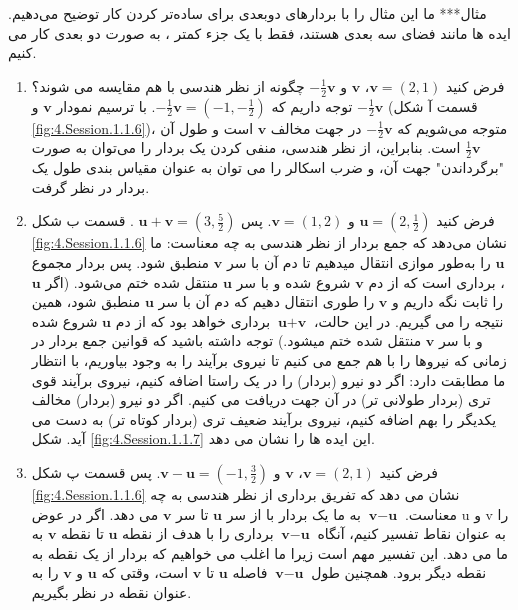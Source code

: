 {\begin{spacing}{1.5}
        مثال***
        ما این مثال را با بردارهای دوبعدی برای ساده‌تر کردن کار توضیح می‌دهیم. ایده ها مانند فضای سه بعدی هستند، فقط با یک جزء کمتر ، به صورت دو بعدی کار می کنیم.

        \begin{enumerate}
            \item {فرض کنید $\textbf{v}=(2,1)$، $\textbf{v}$ و $-\frac{1}{2}\textbf{v}$ چگونه از نظر هندسی با هم مقایسه می شوند؟
            توجه داریم که $-\frac{1}{2}\textbf{v}=(-1,-\frac{1}{2})$.
            با ترسیم نمودار $\textbf{v}$ و $-\frac{1}{2}\textbf{v}$ (قسمت آ شکل \ref{fig:4.Session.1.1.6})،
            متوجه می‌شویم که $-\frac{1}{2}\textbf{v}$ در جهت مخالف $\textbf{v}$ است و طول آن $\frac{1}{2}\textbf{v}$ است.
            بنابراین، از نظر هندسی، منفی کردن یک بردار را می‌توان به صورت "برگرداندن" جهت آن،
            و ضرب اسکالر را می توان به عنوان مقیاس بندی طول یک بردار در نظر گرفت.}

            \item {فرض کنید $\textbf{u}=(2,\frac{1}{2})$ و $\textbf{v}=(1,2)$. پس $\textbf{u}+\textbf{v}=(3,\frac{5}{2})$ .
            قسمت ب شکل \ref{fig:4.Session.1.1.6} نشان می‌دهد که جمع بردار از نظر هندسی به چه معناست:
            ما $\textbf{u}$ را به‌طور موازی انتقال میدهیم تا دم آن با سر $\textbf{v}$ منطبق شود.
            پس بردار مجموع ، برداری است که از دم $\textbf{v}$ شروع شده و با سر $\textbf{u}$ منتقل شده ختم می‌شود.
                (اگر $\textbf{u}$ را ثابت نگه داریم و $\textbf{v}$ را طوری انتقال دهیم که دم آن با سر $\textbf{u}$ منطبق شود، همین نتیجه را می گیریم.
                در این حالت، $\textbf{u}+\textbf{v}$ برداری خواهد بود که از دم $\textbf{u}$ شروع شده و با سر $\textbf{v}$ منتقل شده ختم میشود.)
                توجه داشته باشید که قوانین جمع بردار در زمانی که نیروها را با هم جمع می کنیم تا نیروی برآیند را به وجود بیاوریم، با انتظار ما مطابقت دارد:
                اگر دو نیرو (بردار) را در یک راستا اضافه کنیم، نیروی برآیند قوی تری (بردار طولانی تر) در آن جهت دریافت می کنیم.
                اگر دو نیرو (بردار) مخالف یکدیگر را بهم اضافه کنیم، نیروی برآیند ضعیف تری (بردار کوتاه تر) به دست می آید.
                شکل \ref{fig:4.Session.1.1.7} این ایده ها را نشان می دهد.}

            \item {فرض کنید $\textbf{v}=(2,1)$، $\textbf{v}$ و $\textbf{v}-\textbf{u}=(-1,\frac{3}{2})$. پس
            قسمت پ شکل \ref{fig:4.Session.1.1.6} نشان می دهد که تفریق برداری از نظر هندسی به چه معناست.
                $\textbf{v}-\textbf{u}$ به ما یک بردار با از سر $\textbf{u}$ تا سر $\textbf{v}$ می دهد.
                اگر در عوض u و v را به عنوان نقاط تفسیر کنیم، آنگاه $\textbf{v}-\textbf{u}$ برداری را با هدف از نقطه $\textbf{u}$ تا نقطه $\textbf{v}$ به ما می دهد.
                این تفسیر مهم است زیرا ما اغلب می خواهیم که بردار از یک نقطه به نقطه دیگر برود.
                همچنین طول $\textbf{v}-\textbf{u}$ فاصله $\textbf{u}$ تا $\textbf{v}$ است، وقتی که $\textbf{u}$ و $\textbf{v}$ را به عنوان نقطه در نظر بگیریم.}
        \end{enumerate}


\end{spacing}}
